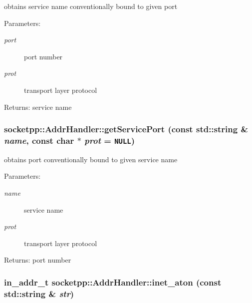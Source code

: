 obtains service name conventionally bound to given port 

\begin{Desc}
\item[Parameters:]
\begin{description}
\item[{\em port}]port number \item[{\em prot}]transport layer protocol \end{description}
\end{Desc}
\begin{Desc}
\item[Returns:]service name \end{Desc}
\hypertarget{classsocketpp_1_1AddrHandler_b02210173edbb5691a3e76a5978cfce6}{
\subsubsection[{getServicePort}]{ socketpp::AddrHandler::getServicePort (const std::string \& {\em name}, \/  const char $\ast$ {\em prot} = {\tt NULL})}}
\label{classsocketpp_1_1AddrHandler_b02210173edbb5691a3e76a5978cfce6}


obtains port conventionally bound to given service name 

\begin{Desc}
\item[Parameters:]
\begin{description}
\item[{\em name}]service name \item[{\em prot}]transport layer protocol \end{description}
\end{Desc}
\begin{Desc}
\item[Returns:]port number \end{Desc}
\hypertarget{classsocketpp_1_1AddrHandler_e2eda37cd4c20059c557e4e65c829cf8}{
\subsubsection[{inet\_\-aton}]{\setlength{\rightskip}{0pt plus 5cm}in\_\-addr\_\-t socketpp::AddrHandler::inet\_\-aton (const std::string \& {\em str})}}
\label{classsocketpp_1_1AddrHandler_e2eda37cd4c20059c557e4e65c829cf8}


